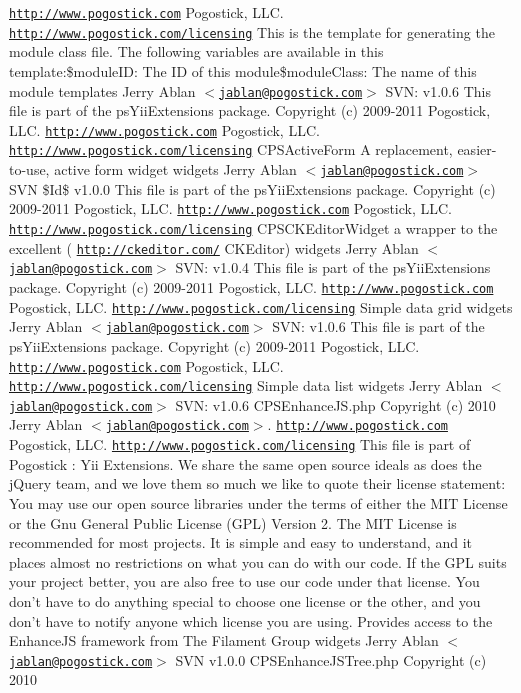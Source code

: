 \href{http://www.pogostick.com}{\tt http://www.pogostick.com} Pogostick, LLC.  \href{http://www.pogostick.com/licensing}{\tt http://www.pogostick.com/licensing} This is the template for generating the module class file. The following variables are available in this template:\$moduleID: The ID of this module\$moduleClass: The name of this module   templates   Jerry Ablan $<$\href{mailto:jablan@pogostick.com}{\tt jablan@pogostick.com}$>$  SVN:   v1.0.6    This file is part of the psYiiExtensions package.   Copyright (c) 2009-\/2011 Pogostick, LLC.  \href{http://www.pogostick.com}{\tt http://www.pogostick.com} Pogostick, LLC.  \href{http://www.pogostick.com/licensing}{\tt http://www.pogostick.com/licensing} CPSActiveForm A replacement, easier-\/to-\/use, active form widget   widgets   Jerry Ablan $<$\href{mailto:jablan@pogostick.com}{\tt jablan@pogostick.com}$>$  SVN \$Id\$  v1.0.0    This file is part of the psYiiExtensions package.   Copyright (c) 2009-\/2011 Pogostick, LLC.  \href{http://www.pogostick.com}{\tt http://www.pogostick.com} Pogostick, LLC.  \href{http://www.pogostick.com/licensing}{\tt http://www.pogostick.com/licensing} CPSCKEditorWidget a wrapper to the excellent ( \href{http://ckeditor.com/}{\tt http://ckeditor.com/} CKEditor)   widgets   Jerry Ablan $<$\href{mailto:jablan@pogostick.com}{\tt jablan@pogostick.com}$>$  SVN:   v1.0.4    This file is part of the psYiiExtensions package.   Copyright (c) 2009-\/2011 Pogostick, LLC.  \href{http://www.pogostick.com}{\tt http://www.pogostick.com} Pogostick, LLC.  \href{http://www.pogostick.com/licensing}{\tt http://www.pogostick.com/licensing} Simple data grid   widgets   Jerry Ablan $<$\href{mailto:jablan@pogostick.com}{\tt jablan@pogostick.com}$>$  SVN:   v1.0.6    This file is part of the psYiiExtensions package.   Copyright (c) 2009-\/2011 Pogostick, LLC.  \href{http://www.pogostick.com}{\tt http://www.pogostick.com} Pogostick, LLC.  \href{http://www.pogostick.com/licensing}{\tt http://www.pogostick.com/licensing} Simple data list   widgets   Jerry Ablan $<$\href{mailto:jablan@pogostick.com}{\tt jablan@pogostick.com}$>$  SVN:   v1.0.6    CPSEnhanceJS.php  Copyright (c) 2010 Jerry Ablan $<$\href{mailto:jablan@pogostick.com}{\tt jablan@pogostick.com}$>$.  \href{http://www.pogostick.com}{\tt http://www.pogostick.com} Pogostick, LLC.  \href{http://www.pogostick.com/licensing}{\tt http://www.pogostick.com/licensing}  This file is part of Pogostick : Yii Extensions.  We share the same open source ideals as does the jQuery team, and we love them so much we like to quote their license statement:  You may use our open source libraries under the terms of either the MIT License or the Gnu General Public License (GPL) Version 2.  The MIT License is recommended for most projects. It is simple and easy to understand, and it places almost no restrictions on what you can do with our code.  If the GPL suits your project better, you are also free to use our code under that license.  You don’t have to do anything special to choose one license or the other, and you don’t have to notify anyone which license you are using. Provides access to the EnhanceJS framework from The Filament Group   widgets   Jerry Ablan $<$\href{mailto:jablan@pogostick.com}{\tt jablan@pogostick.com}$>$  SVN   v1.0.0    CPSEnhanceJSTree.php  Copyright (c) 2010 